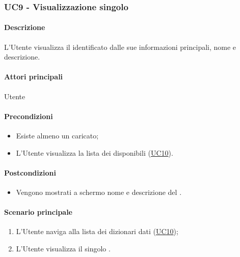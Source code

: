 \subsubsection{UC9 - Visualizzazione singolo }\label{UC9}
\paragraph*{Descrizione}
L’Utente visualizza il  identificato dalle sue informazioni principali, nome e descrizione.

\paragraph*{Attori principali}
Utente

\paragraph*{Precondizioni}
\begin{itemize}
  \item Esiste almeno un  caricato;
  \item L'Utente visualizza la lista dei  disponibili (\hyperref[UC10]{UC10}).
\end{itemize}

\paragraph*{Postcondizioni}
\begin{itemize}
  \item Vengono mostrati a schermo nome e descrizione del .
\end{itemize}

\paragraph*{Scenario principale}
\begin{enumerate}
  \item L’Utente naviga alla lista dei dizionari dati (\hyperref[UC10]{UC10});
  \item L’Utente visualizza il singolo .
\end{enumerate}
